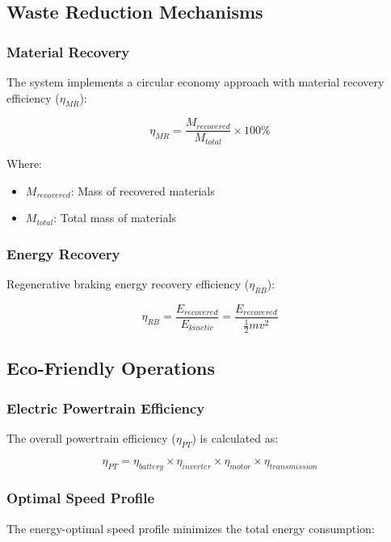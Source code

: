 \documentclass[12pt,a4paper]{article}
\begin{document}
\subsection{Waste Reduction Mechanisms}
\subsubsection{Material Recovery}
The system implements a circular economy approach with material recovery efficiency (\(\eta_{MR}\)):

\begin{equation}
\eta_{MR} = \frac{M_{recovered}}{M_{total}} \times 100\%
\end{equation}

Where:
\begin{itemize}
    \item \(M_{recovered}\): Mass of recovered materials
    \item \(M_{total}\): Total mass of materials
\end{itemize}

\subsubsection{Energy Recovery}
Regenerative braking energy recovery efficiency (\(\eta_{RB}\)):

\begin{equation}
\eta_{RB} = \frac{E_{recovered}}{E_{kinetic}} = \frac{E_{recovered}}{\frac{1}{2}mv^2}
\end{equation}

\subsection{Eco-Friendly Operations}
\subsubsection{Electric Powertrain Efficiency}
The overall powertrain efficiency (\(\eta_{PT}\)) is calculated as:

\begin{equation}
\eta_{PT} = \eta_{battery} \times \eta_{inverter} \times \eta_{motor} \times \eta_{transmission}
\end{equation}

\subsubsection{Optimal Speed Profile}
The energy-optimal speed profile minimizes the total energy consumption:
\end{document}
